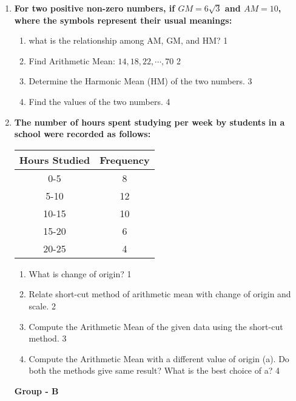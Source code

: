 \documentclass{article}
\begin{document}
\begin{enumerate}
\item
\textbf{For two positive non-zero numbers, if $GM = 6\sqrt{3}$ and $AM = 10$, where the symbols represent their usual meanings:}

\begin{enumerate}
    \item what is the relationship among AM, GM, and HM? \hfill 1
    \item Find Arithmetic Mean: $14,18,22, \cdots, 70$ \hfill 2
    \item  
    Determine the Harmonic Mean (HM) of the two numbers. \hfill 3
    \item
    Find the values of the two numbers. \hfill 4
    
\end{enumerate}

   \item
\textbf{The number of hours spent studying per week by students in a school were recorded as follows:}

\begin{table}[h]
\centering
\begin{tabular}{c|c}
\textbf{Hours Studied} & \textbf{Frequency} \\ \hline
0-5                   & 8                  \\ \hline
5-10                  & 12                 \\ \hline
10-15                 & 10                 \\ \hline
15-20                 & 6                  \\ \hline
20-25                 & 4                 
\end{tabular}
\end{table}

    \begin{enumerate}
    \item What is change of origin? \hfill 1
    \item
	Relate short-cut method of arithmetic mean with change of origin and scale. \hfill 2
    \item  
	Compute the Arithmetic Mean of the given data using the short-cut method. \hfill 3
    \item
	Compute the Arithmetic Mean with a different value of origin (a). Do both the methods give same result? What is the best choice of a? \hfill 4
  \end{enumerate}


\begin{center}
\textbf{Group  - B}
\end{center}


\end{enumerate}
\end{document}
